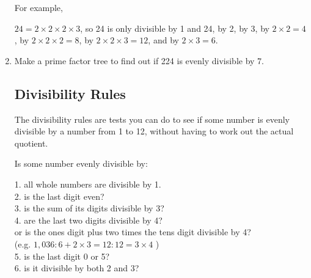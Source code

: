 \documentclass[12pt]{article}
\begin{document}
\begin{enumerate}
For example,\\
\begin{center}
\end{center}

$24 = 2 \times 2 \times 2 \times 3$, so 24 is only divisible by 1 and 24, by 2, by 3, by $2 \times 2 = 4$, by $2 \times 2 \times 2 = 8$, by $2 \times 2 \times 3 = 12$, and by $2 \times 3 = 6$.\\

\item Make a prime factor tree to find out if 224 is evenly divisible by 7.

\subsection*{Divisibility Rules}

The divisibility rules are tests you can do to see if some number is evenly divisible by a number from 1 to 12, without having to work out the actual quotient.

Is some number evenly divisible by:

1. all whole numbers are divisible by 1.\\

2. is the last digit even?\\

3. is the sum of its digits divisible by 3?\\

4. are the last two digits divisible by 4?\\

\hspace{2ex} or is the ones digit plus two times the tens digit divisible by 4?\\

\hspace{2ex}(e.g. $1,036: 6 + 2 \times 3 = 12: 12 = 3 \times 4$ \Checkmark)\\

5. is the last digit 0 or 5?\\

6. is it divisible by both 2 and 3?\\


\end{enumerate}
\end{document}
